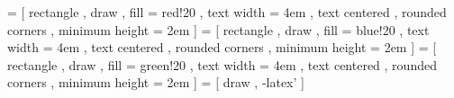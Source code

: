  = [
    rectangle
    , draw
    , fill = red!20
    , text width = 4em
    , text centered
    , rounded corners
    , minimum height = 2em
]
 = [
    rectangle
    , draw
    , fill = blue!20
    , text width = 4em
    , text centered
    , rounded corners
    , minimum height = 2em
]
 = [
    rectangle
    , draw
    , fill = green!20
    , text width = 4em
    , text centered
    , rounded corners
    , minimum height = 2em
]
 = [
    draw
    , -latex'
]

